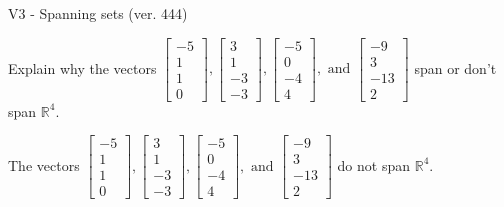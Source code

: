 \begin{exercise}
  \begin{exerciseTitle}V3 - Spanning sets (ver. 444)\end{exerciseTitle}
  \begin{exerciseStatement}
    Explain why the vectors \(\left[\begin{array}{r}
-5 \\
1 \\
1 \\
0
\end{array}\right] , \left[\begin{array}{r}
3 \\
1 \\
-3 \\
-3
\end{array}\right] , \left[\begin{array}{r}
-5 \\
0 \\
-4 \\
4
\end{array}\right] , \text{ and } \left[\begin{array}{r}
-9 \\
3 \\
-13 \\
2
\end{array}\right]\) span or don't span \(\mathbb{R}^4\). 
	


  \end{exerciseStatement}
  \begin{exerciseAnswer}
   The vectors \(\left[\begin{array}{r}
-5 \\
1 \\
1 \\
0
\end{array}\right] , \left[\begin{array}{r}
3 \\
1 \\
-3 \\
-3
\end{array}\right] , \left[\begin{array}{r}
-5 \\
0 \\
-4 \\
4
\end{array}\right] , \text{ and } \left[\begin{array}{r}
-9 \\
3 \\
-13 \\
2
\end{array}\right]\) 
  	 do not  
	span \(\mathbb{R}^4\).
  


  \end{exerciseAnswer}
\end{exercise}